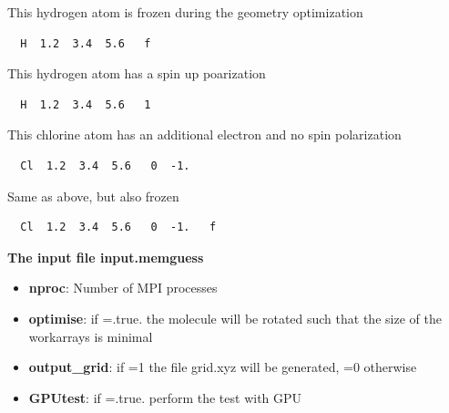 \documentclass[a4paper,11pt]{report}
\begin{document}
This hydrogen atom is frozen during the geometry optimization
\begin{verbatim}
  H  1.2  3.4  5.6   f
\end{verbatim}

This hydrogen atom has a spin up poarization
\begin{verbatim}
  H  1.2  3.4  5.6   1
\end{verbatim}

This chlorine atom has an additional electron and no spin polarization
\begin{verbatim}
  Cl  1.2  3.4  5.6   0  -1.
\end{verbatim}

Same as above, but also frozen
\begin{verbatim}
  Cl  1.2  3.4  5.6   0  -1.   f
\end{verbatim}

\pagebreak
\begin{center} \large
{ \bf The input file input.memguess}
\end{center}
\begin{itemize}
Before running BigDFT it is recommended to run the memguess routine. If it runs correctly all input files are available 
(this routine needs a posinp.xyz and does not accept a list\_posinp file). It then allows to estimate the required memory and to 
find an optimal number of MPI processes for a parallel run. For good load balancing each MPI process should roughly treat the same number 
of orbitals. The memguess program prints out the number of orbitals and how many orbitals are treated by each MPI process. 
On a parallel machine with a high performance interconnect network on can choose the number of MPI processes {\bf nproc} equal 
to the number of occupied orbitals, i.e. each MPI process treats one orbital. On machines with slower networks each MPI process should 
have at least 2 to 4 orbitals. 
\item {\bf nproc}: Number of MPI processes
\item {\bf optimise}: if =.true. the molecule will be rotated such that the size of the workarrays is minimal
\item {\bf output_grid}: if =1 the file grid.xyz will be generated, =0 otherwise
\item {\bf GPUtest}: if =.true. perform the test with GPU
\end{itemize}
\end{document}
